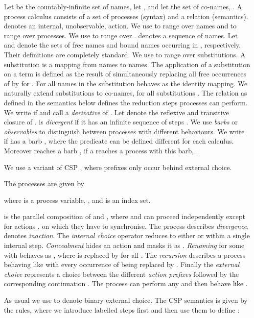 \documentclass[]{eptcs}
\begin{document}
Let  be the countably-infinite set of names, let , and let  the set of co-names, \ie .
A process calculus  consists of a set of processes  (syntax) and a relation  (semantics).
 denotes an internal, \ie unobservable, action.
We use  to range over names and  to range over processes.
We use  to range over .
 denotes a sequence of names.
Let  and   denote the sets of free names and bound names occurring in , respectively.
Their definitions are completely standard.
We use  to range over substitutions.
A substitution is a mapping  from names to names.
The application of a substitution on a term  is defined as the result of simultaneously replacing all free occurrences of  by  for .
For all names in  the substitution behaves as the identity mapping.
We naturally extend substitutions to co-names, \ie  for all substitutions .
The relation  as defined in the semantics below defines the reduction steps processes can perform. We write  if  and call  a \emph{derivative} of .
Let  denote the reflexive and transitive closure of .
 is \emph{divergent} if it has an infinite sequence of steps .
We use \emph{barbs} or \emph{observables} to distinguish between processes with different behaviours. We write  if  has a barb , where the predicate  can be defined different for each calculus. Moreover  reaches a barb , if  a reaches a process with this barb, \ie .

We use a variant of CSP \cite{hoare:78csp}, where prefixes only occur behind external choice.
\begin{definition}\label{CSPSyntax}
The processes  are given by

	where  is a process variable, , and  is an index set.
\end{definition}

 is the parallel composition of  and , where  and  can proceed independently except for actions , on which they have to synchronise.
The process  describes \emph{divergence}.
 denotes \emph{inaction}.
The \emph{internal choice} operator  reduces to either  or  within a single internal step.
\emph{Concealment}  hides an action  and masks it as .
\emph{Renaming}  for some  with  behaves as , where  is replaced by  for all .
The \emph{recursion}  describes a process behaving like  with every occurrence of  being replaced by .
Finally the \emph{external choice}  represents a choice between the different \emph{action prefixes}  followed by the corresponding continuation . The process can perform any  and then behave like .
 
As usual we use  to denote binary external choice.
The CSP semantics is given by the rules, where we introduce labelled steps  first and then use them to define :
\vspace{-0.75em}
\end{document}
